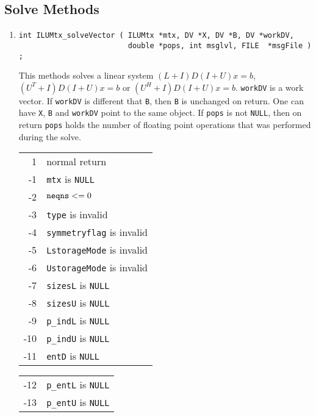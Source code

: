 \subsection{Solve Methods}
\label{subsection:ILUMtx:proto:solve}
\par
\begin{enumerate}
\item
\begin{verbatim}
int ILUMtx_solveVector ( ILUMtx *mtx, DV *X, DV *B, DV *workDV,
                         double *pops, int msglvl, FILE  *msgFile ) ;
\end{verbatim}
This methods solves a linear system
$(L + I)D(I + U)x = b$, $(U^T + I)D(I + U)x = b$ or
$(U^H + I)D(I + U)x = b$.
{\tt workDV} is a work vector.
If {\tt workDV} is different that {\tt B}, then {\tt B} is
unchanged on return.
One can have {\tt X}, {\tt B} and {\tt workDV} point to the same
object.
If {\tt pops} is not {\tt NULL}, then
on return {\tt *pops} holds the number of floating point operations
that was performed during the solve.
\par {}
\begin{center}
\begin{tabular}{rl}
 1 & normal return \\
-1 & {\tt mtx} is {\tt NULL} \\
-2 & ${\tt neqns} <= 0$ \\
-3 & {\tt type} is invalid \\
-4 & {\tt symmetryflag} is invalid \\
-5 & {\tt LstorageMode} is invalid \\
-6 & {\tt UstorageMode} is invalid \\
-7 & {\tt sizesL} is {\tt NULL} \\
-8 & {\tt sizesU} is {\tt NULL} \\
-9 & {\tt p\_indL} is {\tt NULL} \\
-10 & {\tt p\_indU} is {\tt NULL} \\
-11 & {\tt entD} is {\tt NULL} \\
\end{tabular}
\quad
\begin{tabular}{rl}
-12 & {\tt p\_entL} is {\tt NULL} \\
-13 & {\tt p\_entU} is {\tt NULL} \\

\end{tabular}
\end{center}
\end{enumerate}
